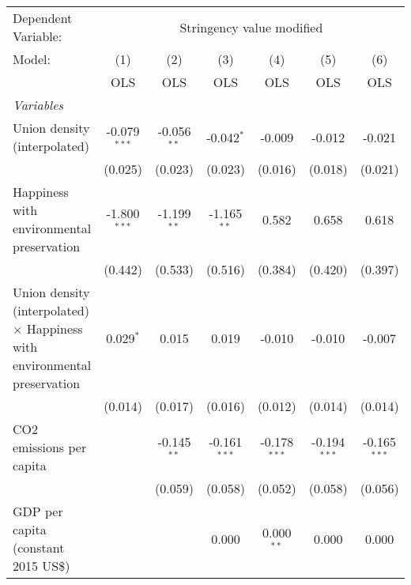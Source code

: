 
\begingroup
\centering
\begin{tabular}{lcccccc}
   \toprule
   Dependent Variable: & \multicolumn{6}{c}{Stringency value modified}\\
   Model:                                                                           & (1)            & (2)           & (3)            & (4)            & (5)            & (6)\\  
                                                                                    &  OLS           & OLS           & OLS            & OLS            & OLS            & OLS\\  
   \midrule
   \emph{Variables}\\
   Union density (interpolated)                                                     & -0.079$^{***}$ & -0.056$^{**}$ & -0.042$^{*}$   & -0.009         & -0.012         & -0.021\\   
                                                                                    & (0.025)        & (0.023)       & (0.023)        & (0.016)        & (0.018)        & (0.021)\\   
   Happiness with environmental preservation                                        & -1.800$^{***}$ & -1.199$^{**}$ & -1.165$^{**}$  & 0.582          & 0.658          & 0.618\\   
                                                                                    & (0.442)        & (0.533)       & (0.516)        & (0.384)        & (0.420)        & (0.397)\\   
   Union density (interpolated) $\times$ Happiness with environmental preservation  & 0.029$^{*}$    & 0.015         & 0.019          & -0.010         & -0.010         & -0.007\\   
                                                                                    & (0.014)        & (0.017)       & (0.016)        & (0.012)        & (0.014)        & (0.014)\\   
   CO2 emissions per capita                                                         &                & -0.145$^{**}$ & -0.161$^{***}$ & -0.178$^{***}$ & -0.194$^{***}$ & -0.165$^{***}$\\   
                                                                                    &                & (0.059)       & (0.058)        & (0.052)        & (0.058)        & (0.056)\\   
   GDP per capita (constant 2015 US\$)                                              &                &               & 0.000          & 0.000$^{**}$   & 0.000          & 0.000\\   

\end{tabular}
